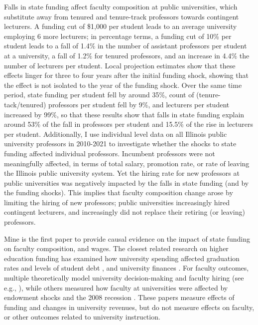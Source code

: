 Falls in state funding affect faculty composition at public universities, which substitute away from tenured and tenure-track professors towards contingent lecturers.
A funding cut of \$1,000 per student leads to an average university employing 6 more lecturers;
in percentage terms, a funding cut of 10\% per student leads to a fall of 1.4\% in the number of assistant professors per student at a university, a fall of 1.2\% for tenured professors, and an increase in 4.4\% the number of lecturers per student.
Local projection estimates show that these effects linger for three to four years after the initial funding shock, showing that the effect is not isolated to the year of the funding shock. 
Over the same time period, state funding per student fell by around 35\%, count of (tenure-tack/tenured) professors per student fell by 9\%, and lecturers per student increased by 99\%, so that these results show that falls in state funding explain around 53\% of the fall in professors per student
and 15.5\% of the rise in lecturers per student.
Additionally, I use individual level data on all Illinois public university professors in 2010-2021 to investigate whether the shocks to state funding affected individual professors.
Incumbent professors were not meaningfully affected, in terms of total salary, promotion rate, or rate of leaving the Illinois public university system.
Yet the hiring rate for new professors at public universities was negatively impacted by the falls in state funding (and by the funding shocks).
This implies that faculty composition change arose by limiting the hiring of new professors; public universities increasingly hired contingent lecturers, and increasingly did not replace their retiring (or leaving) professors.

Mine is the first paper to provide causal evidence on the impact of state funding on faculty composition, and wages.
The closest related research on higher education funding has examined how university spending affected graduation rates and levels of student debt \citep{NBERw23736,NBERw27885}, and university finances \citep{miller2022making,bound2019public,brown2014endowment}.
For faculty outcomes, multiple theoretically model university decision-making and faculty hiring (see e.g., \citealt{abe2015implications,johnson2009jep,NBERc13879}), while others measured how faculty at universities were affected by endowment shocks and the 2008 recession \citep{brown2014endowment,turner2014impact}.
These papers measure effects of funding and changes in university revenues, but do not measure effects on faculty, or other outcomes related to university instruction.

